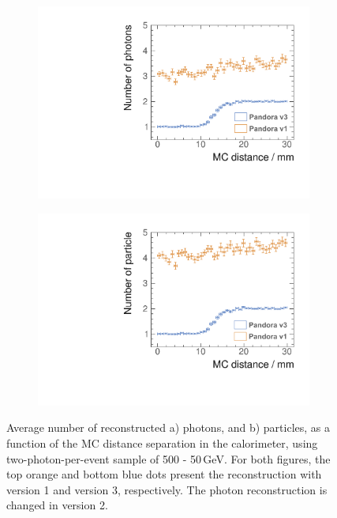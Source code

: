 \begin{figure}[tbph]
\centering
    \begin{subfigure}[b]{0.45\textwidth}
        \includegraphics[width=\textwidth]{photon/DoubleCompareN_p3edit.pdf}
        \caption{}
        \label{fig:photonDoubleCompareN_p}
    \end{subfigure}
    \begin{subfigure}[b]{0.45\textwidth}
        \includegraphics[width=\textwidth]{photon/DoubleCompareN_all2edit.pdf}
        \caption{}
        \label{fig:photonDoubleCompareN_all}
    \end{subfigure}
\caption[Average number of reconstructed photons and reconstructed particles, as a function of the MC distance separation.]
{Average number of reconstructed a) photons, and b) particles, as a function of the MC distance separation in the calorimeter, using two-photon-per-event sample of 500 - 50\,GeV. For both figures, the top orange and bottom blue dots present the reconstruction with \pandora version 1 and version 3, respectively. The photon reconstruction is changed in \pandora version 2.}
\label{fig:photonDoubleCompareN}
\end{figure}





